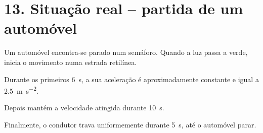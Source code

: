 \documentclass[11pt,a4paper]{article}
\begin{document}
	\section*{13. Situação real -- partida de um automóvel}
	
	\begin{tcolorbox}[
		colback=euflight,
		colframe=eufblue,
		title=\textbf{Movimento num semáforo}
		]
		
		Um automóvel encontra-se parado num semáforo. Quando a luz passa a verde,
		inicia o movimento numa estrada retilínea.
		
		Durante os primeiros \SI{6}{s}, a sua aceleração é aproximadamente
		constante e igual a \SI{2.5}{m.s^{-2}}.
		
		Depois mantém a velocidade atingida durante \SI{10}{s}.
		
		Finalmente, o condutor trava uniformemente durante \SI{5}{s}, até o
		automóvel parar.
		
	\end{tcolorbox}
	
\end{document}
